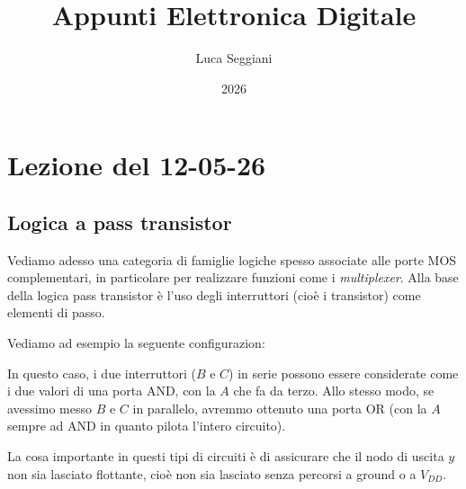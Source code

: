 \documentclass[a4paper,11pt]{article}
\title{Appunti Elettronica Digitale}
\author{Luca Seggiani}
\date{2026}
\begin{document}
\section{Lezione del 12-05-26}

\thispagestyle{empty}
\pagestyle{fancy}

\subsection{Logica a pass transistor}
Vediamo adesso una categoria di famiglie logiche spesso associate alle porte MOS complementari, in particolare per realizzare funzioni come i \textit{multiplexer}. Alla base della logica pass transistor è l'uso degli interruttori (cioè i transistor) come elementi di passo.

Vediamo ad esempio la seguente configurazion:
\begin{center}
\end{center}

In questo caso, i due interruttori ($B$ e $C$) in serie possono essere considerate come i due valori di una porta AND, con la $A$ che fa da terzo. Allo stesso modo, se avessimo messo $B$ e $C$ in parallelo, avremmo ottenuto una porta OR (con la $A$ sempre ad AND in quanto pilota l'intero circuito). 

La cosa importante in questi tipi di circuiti è di assicurare che il nodo di uscita $y$ non sia lasciato flottante, cioè non sia lasciato senza percorsi a ground o a $V_{DD}$.

\par\smallskip
\end{document}
